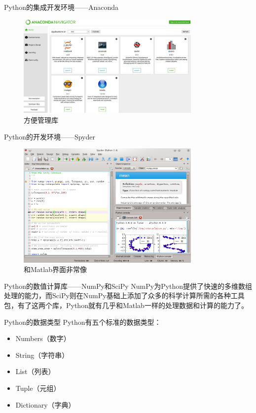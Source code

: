 \documentclass[xcolor=x11names,compress,10pt]{ctexbeamer}
\begin{document}
\begin{frame}{Python的集成开发环境——Anaconda}
\begin{figure}[h!]
\centering
\includegraphics[width=0.8\textwidth]{pictures/anaconda.jpeg}
\caption{方便管理库}
\end{figure}
\end{frame}


\begin{frame}{Python的开发环境——Spyder}
\begin{figure}[h!]
\centering
\includegraphics[width=0.8\textwidth]{pictures/Spyder.png}
\caption{和Matlab界面非常像}
\end{figure}
\end{frame}


\begin{frame}{Python的数值计算库——NumPy和SciPy}
NumPy为Python提供了快速的多维数组处理的能力，而SciPy则在NumPy基础上添加了众多的科学计算所需的各种工具包，有了这两个库，Python就有几乎和Matlab一样的处理数据和计算的能力了。
\end{frame}


\begin{frame}{Python的数据类型}
Python有五个标准的数据类型：
\begin{itemize}
\item Numbers（数字）
\item String（字符串）
\item List（列表）
\item Tuple（元组）
\item Dictionary（字典）
\end{itemize}
\end{frame}
\end{document}
